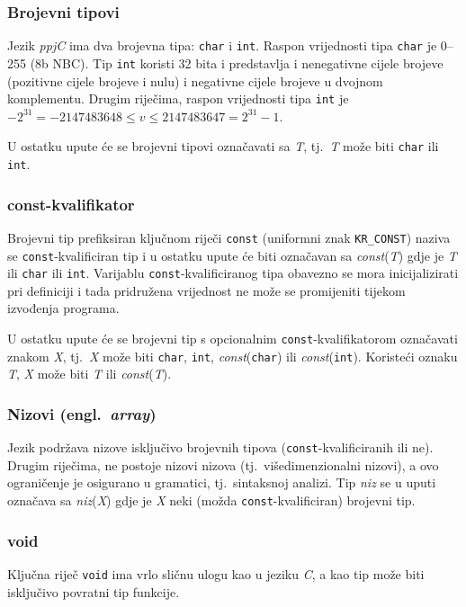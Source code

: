 \documentclass[times, 12pt, utf8]{book}
\begin{document}
\subsubsection{Brojevni tipovi}
Jezik \emph{ppjC} ima dva brojevna tipa: \verb|char| i \verb|int|.
Raspon vrijednosti tipa \verb|char| je 0--255 (8b NBC).
Tip \verb|int| koristi 32 bita i predstavlja i nenegativne cijele brojeve (pozitivne cijele brojeve i nulu) i negativne cijele brojeve u dvojnom komplementu.
Drugim riječima, raspon vrijednosti tipa \verb|int| je \(-2^{31} = -2147483648 \le v \le 2147483647 = 2^{31} - 1\).

U ostatku upute će se brojevni tipovi označavati sa \emph{T}, tj.~\emph{T} može biti \verb|char| ili \verb|int|.

\subsubsection{const-kvalifikator}
Brojevni tip prefiksiran ključnom riječi \verb|const| (uniformni znak \verb|KR_CONST|) naziva se \verb|const|-kvalificiran tip i u ostatku upute će biti označavan sa \emph{const}(\emph{T}) gdje je \emph{T} ili \verb|char| ili \verb|int|.
Varijablu \verb|const|-kvalificiranog tipa obavezno se mora inicijalizirati pri definiciji i tada pridružena vrijednost ne može se promijeniti tijekom izvođenja programa.

U ostatku upute će se brojevni tip s opcionalnim \verb|const|-kvalifikatorom označavati znakom \emph{X}, tj.~\emph{X} može biti \verb|char|, \verb|int|, \emph{const}(\verb|char|) ili \emph{const}(\verb|int|).
Koristeći oznaku \emph{T}, \emph{X} može biti \emph{T} ili \emph{const}(\emph{T}).

\subsubsection{Nizovi (engl.~\emph{array})}
Jezik podržava nizove isključivo brojevnih tipova (\verb|const|-kvalificiranih ili ne).
Drugim riječima, ne postoje nizovi nizova (tj.~višedimenzionalni nizovi), a ovo ograničenje je osigurano u gramatici, tj.~sintaksnoj analizi.
Tip \emph{niz} se u uputi označava sa \emph{niz}(\emph{X}) gdje je \emph{X} neki (možda \verb|const|-kvalificiran) brojevni tip.

\subsubsection{void}
Ključna riječ \verb|void| ima vrlo sličnu ulogu kao u jeziku \emph{C}, a kao tip može biti isključivo povratni tip funkcije.
\end{document}
